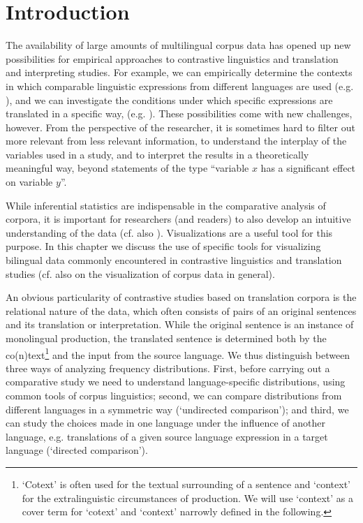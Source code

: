 
\section{Introduction}\label{sec:Introduction}

The availability of large amounts of multilingual corpus data has
opened up new possibilities for empirical approaches to contrastive
linguistics and translation and interpreting studies.
For example, we can empirically determine the contexts in which
comparable linguistic expressions from different languages are used
(e.g.
\citealt{Atayan2021a,Gast2015,Gast2017So,Gast2017Even,Gast2019,Gast2022}),
and we can investigate the conditions under which specific expressions
are translated in a specific way,
(e.g. \citealt{marco_2018,Cribleetal2019,DefrancqMagnifico2020,Defrancq2021,Atayan2021b,Yungetal2023}). These
possibilities come with new challenges, however. From the perspective
of the researcher, it is sometimes hard to filter out more relevant
from less relevant information, to understand the interplay of the
variables used in a study, and to interpret the results in a
theoretically meaningful way, beyond statements of the type ``variable
$x$ has a significant effect on variable $y$''.

While inferential statistics are indispensable in the comparative
analysis of corpora, it is important for researchers (and readers) to
also develop an intuitive understanding of the data (cf. also
\citealt{Griesetal2020}). Visualizations are a useful tool for this
purpose. In this chapter we discuss the use of specific tools for
visualizing bilingual data commonly encountered in contrastive
linguistics and translation studies (cf. also
\citealt{SoenningSchuetzler2023} on the visualization of corpus data
in general).

An obvious particularity of contrastive studies based on translation
corpora is the relational nature of the data, which often consists of
pairs of an original sentences and its translation or
interpretation. While the original sentence is an instance of
monolingual production, the translated sentence is determined both by
the co(n)text\footnote{`Cotext' is often used for the textual
  surrounding of a sentence and `context' for the extralinguistic
  circumstances of production. We will use `context' as a cover term
  for `cotext' and `context' narrowly defined in the following.}  and
the input from the source language. We thus distinguish between three
ways of analyzing frequency distributions. First, before carrying out
a comparative study we need to understand language-specific
distributions, using common tools of corpus linguistics; second, we
can compare distributions from different languages in a symmetric way
(`undirected comparison'); and third, we can study the choices made in
one language under the influence of another language,
e.g. translations of a given source language expression in a target
language (`directed comparison').

